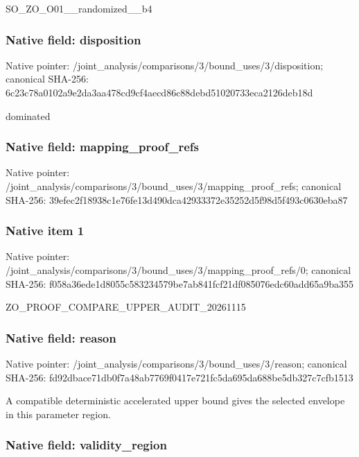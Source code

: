 \documentclass[10pt,a4paper]{article}
\begin{document}
SO\_ZO\_O01\_\_randomized\_\_b4


\subsubsection{Native field: disposition}


Native pointer: /joint\_analysis/comparis\allowbreak{}ons/3/bound\_uses/3/dispo\allowbreak{}sition; canonical SHA-256: 6c23c78a0102a9e2da3aa478\allowbreak{}cd9cf4aecd86c88debd51020\allowbreak{}733eca2126deb18d


dominated


\subsubsection{Native field: mapping\_proof\_refs}


Native pointer: /joint\_analysis/comparis\allowbreak{}ons/3/bound\_uses/3/mappi\allowbreak{}ng\_proof\_refs; canonical SHA-256: 39efec2f18938c1e76fe13d4\allowbreak{}90dca42933372e35252d5f98\allowbreak{}d5f493c0630eba87



\subsubsection{Native item 1}


Native pointer: /joint\_analysis/comparis\allowbreak{}ons/3/bound\_uses/3/mappi\allowbreak{}ng\_proof\_refs/0; canonical SHA-256: f058a36ede1d8055c5832345\allowbreak{}79be7ab841fcf21df085076e\allowbreak{}dc60add65a9ba355


ZO\_PROOF\_COMPARE\_UPPER\_AUDIT\_20261115


\subsubsection{Native field: reason}


Native pointer: /joint\_analysis/comparis\allowbreak{}ons/3/bound\_uses/3/reaso\allowbreak{}n; canonical SHA-256: fd92dbace71db0f7a48ab776\allowbreak{}9f0417e721fc5da695da688b\allowbreak{}e5db327c7cfb1513


A compatible deterministic accelerated upper bound gives the selected envelope in this parameter region.


\subsubsection{Native field: validity\_region}
\end{document}
